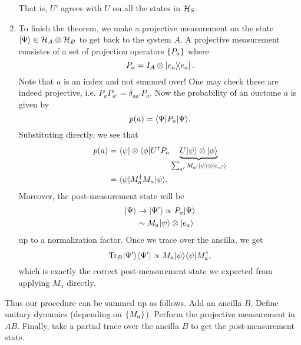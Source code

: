 \begin{enumerate}
\begin{equation}
    \end{equation}
    That is, $U'$ agrees with $U$ on all the states in $\mathcal H_S$.
    \item To finish the theorem, we make a projective measurement on the state $\lvert\Psi\rangle\in \mathcal H_A \otimes \mathcal H_B$ to get back to the system $A$. A projective measurement consistes of a set of projection operators $\{P_a\}$ where
    \begin{equation}
        P_a = I_A \otimes \left\lvert e_a \middle\rangle\!\middle\langle e_a \right\rvert.
    \end{equation}
    Note that $a$ is an index and not summed over!
    One may check these are indeed projective, i.e. $P_a P_{a'}=\delta_{aa'} P_a.$ Now the probability of an ouctome $a$ is given by
    \begin{equation}
        p(a) =\langle\Psi\rvert P_a \lvert\Psi\rangle.
    \end{equation}
    Substituting directly, we see that
    \begin{align*}
        p(a) &= \langle\psi\rvert\otimes \langle\phi\rvert U^\dagger P_a \underbrace{U \lvert\psi\rangle \otimes \lvert\phi\rangle}_{\sum_{a'} M_{a'}\lvert\psi\rangle\otimes \lvert e_{a'}\rangle}\\
            &= \langle\psi\rvert M_a^\dagger M_a \lvert\psi\rangle.
    \end{align*}
    Moreover, the post-measurement state will be
    \begin{align*}
        \lvert\Psi\rangle&\to \lvert\Psi'\rangle\propto P_a \lvert\Psi\rangle\\
            &\sim M_a \lvert\psi\rangle\otimes \lvert e_a\rangle
    \end{align*}
    up to a normalization factor. Once we trace over the ancilla, we get
    \begin{equation}
        \operatorname{Tr}_B \lvert\Psi'\rangle\langle\Psi'\rvert \propto M_a \lvert\psi\rangle\langle\psi\rvert M_a^\dagger,
    \end{equation}
    which is exactly the correct post-measurement state we expected from applying $M_a$ directly.
\end{enumerate}
Thus our procedure can be summed up as follows. Add an ancilla $B$. Define unitary dynamics (depending on $\{M_a\}$). Perform the projective measurement in $AB$. Finally, take a partial trace over the ancilla $B$ to get the post-measurement state.


